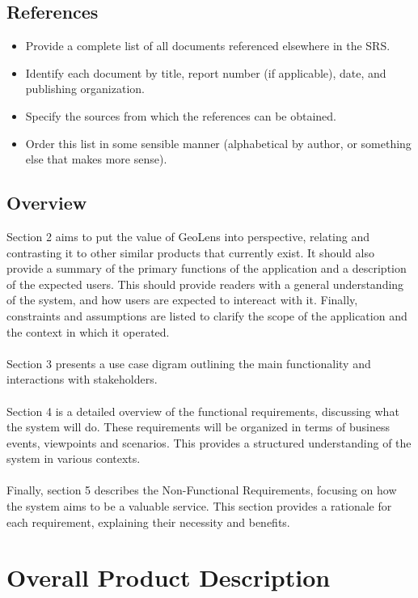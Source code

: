 \documentclass[]{article}
\begin{document}
\subsection{References}
\label{sub:references}
\begin{itemize}
	\item Provide a complete list of all documents referenced elsewhere in the SRS.
	\item Identify each document by title, report number (if applicable), date, and publishing organization.
	\item Specify the sources from which the references can be obtained.
	\item Order this list in some sensible manner (alphabetical by author, or something else that makes more sense).
\end{itemize}

\subsection{Overview}
\label{sub:overview}
Section 2 aims to put the value of GeoLens into perspective, relating and contrasting it to other similar products that currently exist.
It should also provide a summary of the primary functions of the application and a description of the expected users. This should provide readers with a general understanding
of the system, and how users are expected to intereact with it. Finally, constraints and assumptions are listed to clarify the scope of the application and the context in which it operated.\\\\
Section 3 presents a use case digram outlining the main functionality and interactions with stakeholders.\\\\
Section 4 is a detailed overview of the functional requirements, discussing what the system will do. These requirements will be organized in terms of 
business events, viewpoints and scenarios. This provides a structured understanding of the system in various contexts. \\\\
Finally, section 5 describes the Non-Functional Requirements, focusing on how the system aims to be a valuable service. This section provides a rationale for each requirement, explaining their necessity and benefits.


\section{Overall Product Description}
\label{sec:overall_description}
\end{document}
